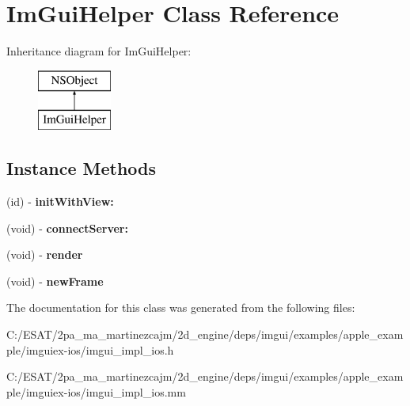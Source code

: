 \hypertarget{interface_im_gui_helper}{}\section{Im\+Gui\+Helper Class Reference}
\label{interface_im_gui_helper}
Inheritance diagram for Im\+Gui\+Helper\+:\begin{figure}[H]
\begin{center}
\leavevmode
\includegraphics[height=2.000000cm]{interface_im_gui_helper}
\end{center}
\end{figure}
\subsection*{Instance Methods}
\begin{DoxyCompactItemize}
\item 
\mbox{\label{interface_im_gui_helper_a0df01ef85b09fa1a936fea889717ff92}} 
(id) -\/ {\bfseries init\+With\+View\+:}
\item 
\mbox{\label{interface_im_gui_helper_a84cb6fc0816b92308377a2ebd6541d9e}} 
(void) -\/ {\bfseries connect\+Server\+:}
\item 
\mbox{\label{interface_im_gui_helper_a2380a751488a46a189d5eb9023f54998}} 
(void) -\/ {\bfseries render}
\item 
\mbox{\label{interface_im_gui_helper_a039cb46a5e13c75d371a15e97d88d994}} 
(void) -\/ {\bfseries new\+Frame}
\end{DoxyCompactItemize}


The documentation for this class was generated from the following files\+:\begin{DoxyCompactItemize}
\item 
C\+:/\+E\+S\+A\+T/2pa\+\_\+ma\+\_\+martinezcajm/2d\+\_\+engine/deps/imgui/examples/apple\+\_\+example/imguiex-\/ios/imgui\+\_\+impl\+\_\+ios.\+h\item 
C\+:/\+E\+S\+A\+T/2pa\+\_\+ma\+\_\+martinezcajm/2d\+\_\+engine/deps/imgui/examples/apple\+\_\+example/imguiex-\/ios/imgui\+\_\+impl\+\_\+ios.\+mm\end{DoxyCompactItemize}
